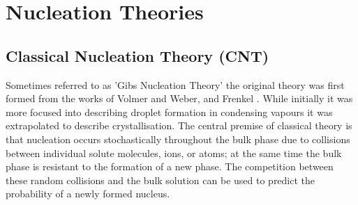 \section{Nucleation Theories}
\subsection{Classical Nucleation Theory (CNT)}
Sometimes referred to as 'Gibs Nucleation Theory' the 
original theory was first formed from the works of Volmer 
and Weber, and Frenkel \cite{Frenkel1939, Volmer1926}. 
While initially it was more focused into describing droplet 
formation in condensing vapours it was extrapolated to describe
crystallisation. The central premise of classical theory 
is that nucleation occurs stochastically throughout the bulk
phase due to collisions between individual solute molecules,
ions, or atoms; at the same time the bulk phase is resistant
to the formation of a new phase. The competition between
these random collisions and the bulk solution can be used to 
predict the probability of a newly formed nucleus.
 
